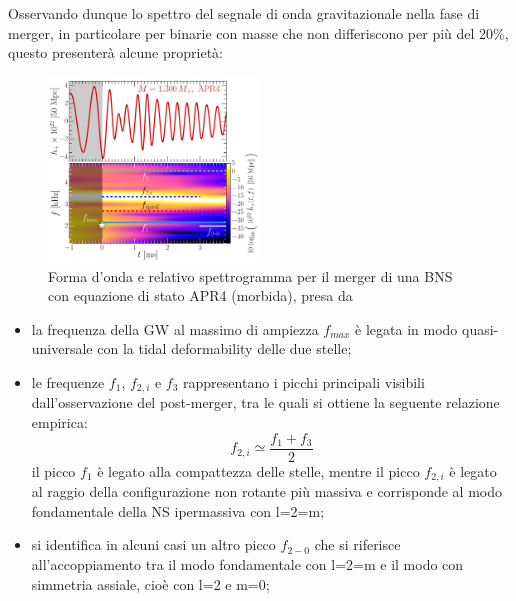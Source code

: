 Osservando dunque lo spettro del segnale di onda gravitazionale nella fase di merger, in particolare per binarie con masse che non differiscono per più del 20\%, questo presenterà alcune proprietà\cite{Rezzolla_2016}:
\begin{figure}
	\vspace{-5pt}
	\begin{center}
		\includegraphics[width=0.5\textwidth]{figures/Capitolo_1/GW_spectrogram_short_APR4-q10-M1300.pdf}
	\end{center}
	\vspace{-10pt}
	\caption{Forma d'onda e relativo spettrogramma per il merger di una BNS con equazione di stato APR4 (morbida), presa da \cite{Rezzolla_2016}}
	\label{fig:spettrogramma_merger_APR4}
	\vspace{-25pt}
\end{figure}
\begin{itemize}
   	\item la frequenza della GW al massimo di ampiezza $f_{max}$ è legata in modo quasi-universale con la tidal deformability delle due stelle;
   	\item le frequenze $f_1$, $f_{2,i}$ e $f_3$ rappresentano i picchi principali visibili dall'osservazione del post-merger, tra le quali si ottiene la seguente relazione empirica:
   	\begin{equation}
   		f_{2,i}\simeq\frac{f_1 + f_3}{2} 
   		\label{eqn:f1_2_3}
   	\end{equation} 
   	il picco $f_1$ è legato alla compattezza delle stelle, mentre il picco $f_{2,i}$ è legato al raggio della configurazione non rotante più massiva e corrisponde al modo fondamentale della NS ipermassiva con l=2=m;
   	\item si identifica in alcuni casi un altro picco $f_{2-0}$ che si riferisce all'accoppiamento tra il modo fondamentale con l=2=m e il modo con simmetria assiale, cioè con l=2 e m=0;
\end{itemize}
   
